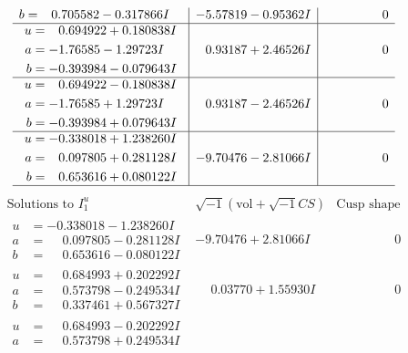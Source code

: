 \documentclass[1p]{elsarticle_modified}
\theoremstyle{definition}
\newcommand{\I}{\sqrt{-1}}
\begin{document}
$$\begin{array}{c|c|c}
\begin{aligned}
b &= \phantom{-}0.705582 - 0.317866 I\end{aligned}
 & -5.57819 - 0.95362 I & \phantom{-0.000000 } 0 \\ \hline\begin{aligned}
u &= \phantom{-}0.694922 + 0.180838 I \\
a &= -1.76585 - 1.29723 I \\
b &= -0.393984 - 0.079643 I\end{aligned}
 & \phantom{-}0.93187 + 2.46526 I & \phantom{-0.000000 } 0 \\ \hline\begin{aligned}
u &= \phantom{-}0.694922 - 0.180838 I \\
a &= -1.76585 + 1.29723 I \\
b &= -0.393984 + 0.079643 I\end{aligned}
 & \phantom{-}0.93187 - 2.46526 I & \phantom{-0.000000 } 0 \\ \hline\begin{aligned}
u &= -0.338018 + 1.238260 I \\
a &= \phantom{-}0.097805 + 0.281128 I \\
b &= \phantom{-}0.653616 + 0.080122 I\end{aligned}
 & -9.70476 - 2.81066 I & \phantom{-0.000000 } 0\\
 \hline 
 \end{array}$$\newpage$$\begin{array}{c|c|c}  
\text{Solutions to }I^u_{1}& \I (\text{vol} + \sqrt{-1}CS) & \text{Cusp shape}\\
 \hline 
\begin{aligned}
u &= -0.338018 - 1.238260 I \\
a &= \phantom{-}0.097805 - 0.281128 I \\
b &= \phantom{-}0.653616 - 0.080122 I\end{aligned}
 & -9.70476 + 2.81066 I & \phantom{-0.000000 } 0 \\ \hline\begin{aligned}
u &= \phantom{-}0.684993 + 0.202292 I \\
a &= \phantom{-}0.573798 - 0.249534 I \\
b &= \phantom{-}0.337461 + 0.567327 I\end{aligned}
 & \phantom{-}0.03770 + 1.55930 I & \phantom{-0.000000 } 0 \\ \hline\begin{aligned}
u &= \phantom{-}0.684993 - 0.202292 I \\
a &= \phantom{-}0.573798 + 0.249534 I \\

\end{aligned}
\end{array}$$
\end{document}
